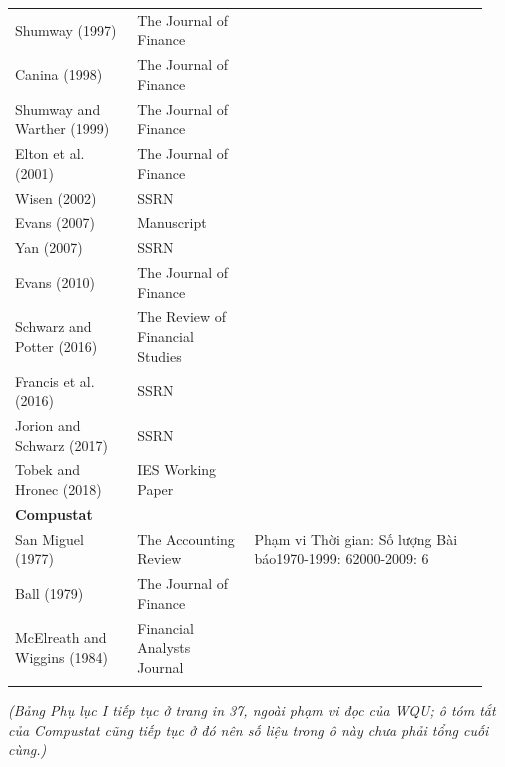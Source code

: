 {\begin{longtable}{>{\raggedright\arraybackslash}p{0.241\linewidth}>{\raggedright\arraybackslash}p{0.236\linewidth}>{\raggedright\arraybackslash}p{0.462\linewidth}}
\addlinespace[2pt]
Shumway (1997) & The Journal of Finance &  \\
\addlinespace[2pt]
Canina (1998) & The Journal of Finance &  \\
\addlinespace[2pt]
Shumway and Warther (1999) & The Journal of Finance &  \\
\addlinespace[2pt]
Elton et al. (2001) & The Journal of Finance &  \\
\addlinespace[2pt]
Wisen (2002) & SSRN &  \\
\addlinespace[2pt]
Evans (2007) & Manuscript &  \\
\addlinespace[2pt]
Yan (2007) & SSRN &  \\
\addlinespace[2pt]
Evans (2010) & The Journal of Finance &  \\
\addlinespace[2pt]
Schwarz and Potter (2016) & The Review of Financial Studies &  \\
\addlinespace[2pt]
Francis et al. (2016) & SSRN &  \\
\addlinespace[2pt]
Jorion and Schwarz (2017) & SSRN &  \\
\addlinespace[2pt]
Tobek and Hronec (2018) & IES Working Paper &  \\
\addlinespace[2pt]
\textbf{Compustat} &  &  \\
\addlinespace[2pt]
San Miguel (1977) & The Accounting Review & Phạm vi Thời gian: Số lượng Bài báo\newline{}1970-1999: 6\newline{}2000-2009: 6 \\
\addlinespace[2pt]
Ball (1979) & The Journal of Finance &  \\
\addlinespace[2pt]
McElreath and Wiggins (1984) & Financial Analysts Journal &  \\
\addlinespace[2pt]
\bottomrule
\end{longtable}
}

\emph{(Bảng Phụ lục I tiếp tục ở trang in 37, ngoài phạm vi đọc của WQU; ô tóm tắt của Compustat cũng tiếp tục ở đó nên số liệu trong ô này chưa phải tổng cuối cùng.)}
